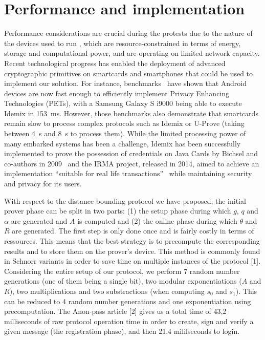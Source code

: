 \section{Performance and implementation}
\label{PerformanceAnalysis}

Performance considerations are crucial during the protests due to the nature of the devices used to run \PRIVO, which are resource-constrained in terms of energy, storage and
computational power, and are operating on limited network capacity. 
Recent technological progress has enabled the deployment of advanced cryptographic primitives on smartcards and smartphones that could be used to implement our solution.
For instance, benchmarks~\cite{Benchmarking} have shown that Android devices are now fast enough to efficiently implement Privacy Enhancing Technologies (PETs), with a Samsung Galaxy S i9000 being able to execute Idemix in \SI{153}{\milli\second}. 
However, those benchmarks also demonstrate that smartcards remain slow to process complex protocols such as Idemix or U-Prove (taking between \SI{4}{\second} and \SI{8}{\second} to process them). 
While the limited processing power of many embarked systems has been a challenge, Idemix has been successfully implemented to prove the possession of credentials on Java Cards by Bichsel and co-authors in 2009~\cite{Bichsel} and the IRMA project, released in 2014, aimed to achieve an implementation ``suitable for real life transactions''~\cite{IRMA} while maintaining security and privacy for its users. 

With respect to the distance-bounding protocol we have proposed, the initial prover phase can be split in two parts: (1) the setup phase during which $g$, $q$ and $\alpha$ are generated and $A$ is computed and (2) the online phase during which $\theta$ and $R$ are generated.
The first step is only done once and is fairly costly in terms of ressources. 
This means that the best strategy is to precompute the corresponding results and to store them on the prover's device. 
This method is commonly found in Schnorr variants in order to save time on multiple instances of the protocol [1].
Considering the entire setup of our protocol, we perform 7 random number generations (one of them being a single bit), two modular exponentiations ($A$ and $R$), two multiplications and two substractions (when computing $s_0$ and $s_1$). 
This can be reduced to 4 random number generations and one exponentiation using precomputation.
The Anon-pass article [2] gives us a total time of 43,2 milliseconds of raw protocol operation time in order to create, sign and verify a given message (the registration phase), and then 21,4 mililseconds to login.

